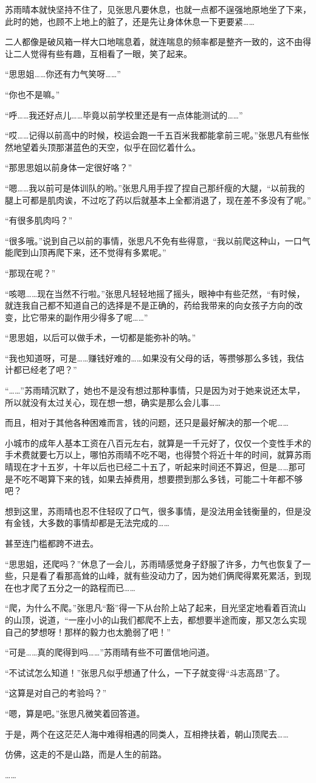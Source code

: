苏雨晴本就快坚持不住了，见张思凡要休息，也就一点都不逞强地原地坐了下来，此时的她，也顾不上地上的脏了，还是先让身体休息一下更要紧……

二人都像是破风箱一样大口地喘息着，就连喘息的频率都是整齐一致的，这不由得让二人觉得有些有趣，互相看了一眼，笑了起来。

“思思姐……你还有力气笑呀……”

“你也不是嘛。”

“呼……我还好点儿……毕竟以前学校里还是有一点体能测试的……”

“哎……记得以前高中的时候，校运会跑一千五百米我都能拿前三呢。”张思凡有些怅然地望着头顶那湛蓝色的天空，似乎在回忆着什么。

“那思思姐以前身体一定很好咯？”

“嗯……我以前可是体训队的哟。”张思凡用手捏了捏自己那纤瘦的大腿，“以前我的腿上可都是肌肉诶，不过吃了药以后就基本上全都消退了，现在差不多没有了呢。”

“有很多肌肉吗？”

“很多哦。”说到自己以前的事情，张思凡不免有些得意，“我以前爬这种山，一口气能爬到山顶再爬下来，还不觉得有多累呢。”

“那现在呢？”

“咳嗯……现在当然不行啦。”张思凡轻轻地摇了摇头，眼神中有些茫然，“有时候，就连我自己都不知道自己的选择是不是正确的，药给我带来的向女孩子方向的改变，比它带来的副作用少得多了呢……”

“思思姐，以后可以做手术，一切都是能弥补的呐。”

“我也知道呀，可是……赚钱好难的……如果没有父母的话，等攒够那么多钱，我估计都已经老了吧？”

“……”苏雨晴沉默了，她也不是没有想过那种事情，只是因为对于她来说还太早，所以就没有太过关心，现在想一想，确实是那么会儿事……

而且，相对于其他各种困难而言，钱的问题，还只是最好解决的那一个呢……

小城市的成年人基本工资在八百元左右，就算是一千元好了，仅仅一个变性手术的手术费就要七万以上，哪怕苏雨晴不吃不喝，也得赞个将近十年的时间，就算苏雨晴现在才十五岁，十年以后也已经二十五了，听起来时间还不算迟，但是……那可是不吃不喝算下来的钱，如果去掉费用，想要攒到那么多钱，可能二十年都不够吧？

想到这里，苏雨晴也忍不住轻叹了口气，很多事情，是没法用金钱衡量的，但是没有金钱，大多数的事情却都是无法完成的……

甚至连门槛都跨不进去。

“思思姐，还爬吗？”休息了一会儿，苏雨晴感觉身子舒服了许多，力气也恢复了一些，只是看了看那高耸的山峰，就有些没动力了，因为她们俩爬得累死累活，到现在也才爬了五分之一的路程而已……

“爬，为什么不爬。”张思凡“豁”得一下从台阶上站了起来，目光坚定地看着百流山的山顶，说道，“一座小小的山我们都爬不上去，都想要半途而废，那又怎么实现自己的梦想呀！那样的毅力也太脆弱了吧！”

“可是……真的爬得到吗……”苏雨晴有些不可置信地问道。

“不试试怎么知道！”张思凡似乎想通了什么，一下子就变得“斗志高昂”了。

“这算是对自己的考验吗？”

“嗯，算是吧。”张思凡微笑着回答道。

于是，两个在这茫茫人海中难得相遇的同类人，互相搀扶着，朝山顶爬去……

仿佛，这走的不是山路，而是人生的前路。

……
